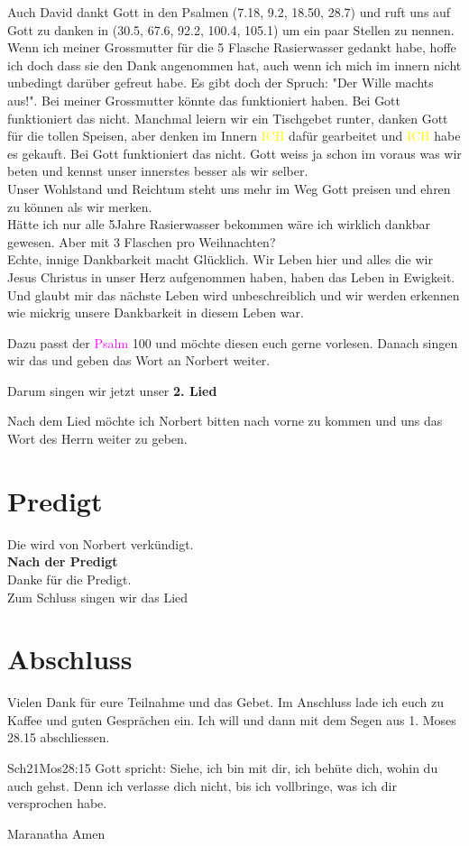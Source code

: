 \documentclass[12pt,a4paper]{scrarticle}
\begin{document}
\begin{spacing}{1.5}
Auch David dankt Gott in den Psalmen (7.18, 9.2, 18.50, 28.7) und ruft uns auf Gott zu danken in (30.5, 67.6, 92.2, 100.4, 105.1) um ein paar Stellen zu nennen.\\
Wenn ich meiner Grossmutter für die 5 Flasche Rasierwasser gedankt habe, hoffe ich doch dass sie den Dank angenommen hat, auch wenn ich mich im innern nicht unbedingt darüber gefreut habe. Es gibt doch der Spruch: "Der Wille machts aus!". Bei meiner Grossmutter könnte das funktioniert haben. Bei Gott funktioniert das nicht. Manchmal leiern wir ein Tischgebet runter, danken Gott für die tollen Speisen, aber denken im Innern \textcolor{yellow}{ICH} dafür gearbeitet und \textcolor{yellow}{ICH} habe es gekauft. Bei Gott funktioniert das nicht. Gott weiss ja schon im voraus was wir beten und kennst unser innerstes besser als wir selber.\\ Unser Wohlstand und Reichtum steht uns mehr im Weg Gott preisen und ehren zu können als wir merken.\\ Hätte ich nur alle 5Jahre Rasierwasser bekommen wäre ich wirklich dankbar gewesen. Aber mit 3 Flaschen pro Weihnachten?\\ Echte, innige Dankbarkeit macht Glücklich. Wir Leben hier und alles die wir Jesus Christus in unser Herz aufgenommen haben, haben das Leben in Ewigkeit. Und glaubt mir das nächste Leben wird unbeschreiblich und wir werden erkennen wie mickrig unsere Dankbarkeit in diesem Leben war.

Dazu passt der \textcolor{magenta}{Psalm} 100 und möchte diesen euch gerne vorlesen. Danach singen wir das  und geben das Wort an Norbert weiter.

\end{spacing}
Darum singen wir jetzt unser \textbf{2. Lied} 

Nach dem Lied möchte ich Norbert bitten nach vorne zu kommen und uns das Wort des Herrn weiter zu geben.

\section{Predigt}
Die wird von Norbert verkündigt.\\

\textbf{Nach der Predigt}\\

Danke für die Predigt.\\

Zum Schluss singen wir das Lied 

\section{Abschluss}
Vielen Dank für eure Teilnahme und das Gebet. Im Anschluss lade ich euch zu Kaffee und guten Gesprächen ein.
Ich will \beten{} und dann mit dem Segen aus 1. Moses 28.15 abschliessen.
\begin{bibeltext}{Sch2}{1Mos}{28:15}
Gott spricht: Siehe, ich bin mit dir,
ich behüte dich, wohin du auch gehst.
Denn ich verlasse dich nicht,
bis ich vollbringe, was ich dir versprochen habe.
\end{bibeltext}
Maranatha Amen
\end{document}
